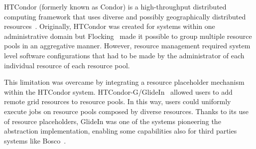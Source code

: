 \documentclass{sig-alternate}
\begin{document}


HTCondor (formerly known as Condor) is a high-throughput distributed computing
framework that uses diverse and possibly geographically distributed
resources~\cite{thain2005}. Originally, HTCondor was created for systems within
one administrative domain but Flocking~\cite{epema1996worldwide} made it
possible to group multiple resource pools in an aggregative manner. However,
resource management required system level software configurations that had to be
made by the administrator of each individual resource of each resource pool.


This limitation was overcame by integrating a resource placeholder mechanism
within the HTCondor system. HT\-Con\-dor-G/Gli\-de\-In~\cite{frey2002condorG}
allowed users to add remote grid resources to resource pools. In this way, users
could uniformly execute jobs on resource pools composed by diverse resources.
Thanks to its use of resource placeholders, GlideIn was one of the systems
pioneering the \pilot abstraction implementation, enabling some \pilot
capabilities also for third parties systems like Bosco~\cite{weitzel2012campus}.

 
\end{document}
